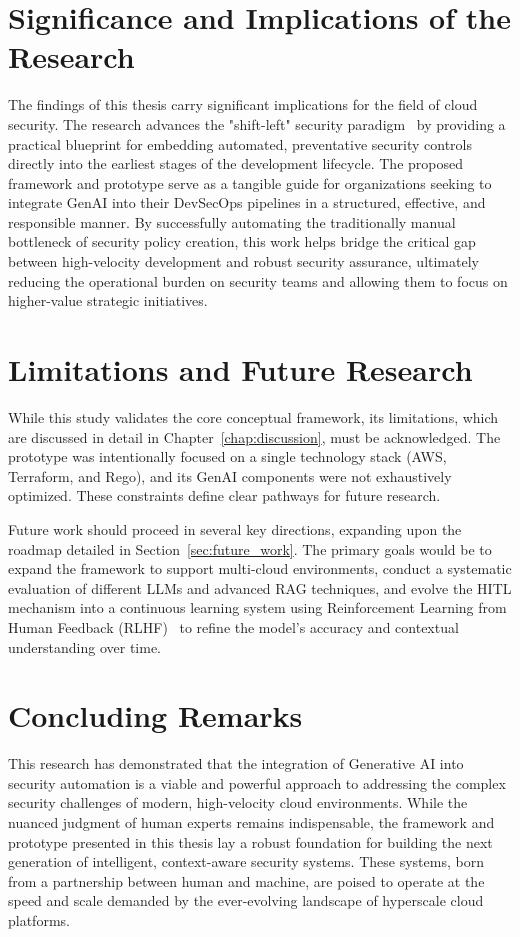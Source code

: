 \section{Significance and Implications of the Research}

The findings of this thesis carry significant implications for the field of cloud security. The research advances the "shift-left" security paradigm~\cite{akto_shift_2025} by providing a practical blueprint for embedding automated, preventative security controls directly into the earliest stages of the development lifecycle. The proposed framework and prototype serve as a tangible guide for organizations seeking to integrate GenAI into their DevSecOps pipelines in a structured, effective, and responsible manner. By successfully automating the traditionally manual bottleneck of security policy creation, this work helps bridge the critical gap between high-velocity development and robust security assurance, ultimately reducing the operational burden on security teams and allowing them to focus on higher-value strategic initiatives.

\section{Limitations and Future Research}

While this study validates the core conceptual framework, its limitations, which are discussed in detail in Chapter~\ref{chap:discussion}, must be acknowledged. The prototype was intentionally focused on a single technology stack (AWS, Terraform, and Rego), and its GenAI components were not exhaustively optimized. These constraints define clear pathways for future research.

Future work should proceed in several key directions, expanding upon the roadmap detailed in Section~\ref{sec:future_work}. The primary goals would be to expand the framework to support multi-cloud environments, conduct a systematic evaluation of different LLMs and advanced RAG techniques, and evolve the HITL mechanism into a continuous learning system using Reinforcement Learning from Human Feedback (RLHF)~\cite{ouyang_training_2022} to refine the model’s accuracy and contextual understanding over time.

\section{Concluding Remarks}

This research has demonstrated that the integration of Generative AI into security automation is a viable and powerful approach to addressing the complex security challenges of modern, high-velocity cloud environments. While the nuanced judgment of human experts remains indispensable, the framework and prototype presented in this thesis lay a robust foundation for building the next generation of intelligent, context-aware security systems. These systems, born from a partnership between human and machine, are poised to operate at the speed and scale demanded by the ever-evolving landscape of hyperscale cloud platforms.